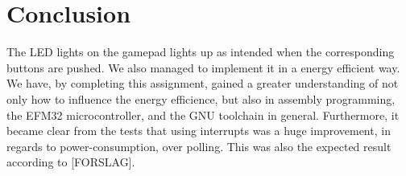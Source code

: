 \section{Conclusion}

The LED lights on the gamepad lights up as intended when the corresponding buttons are pushed. We also managed to implement it in a energy efficient way. We have, by completing this assignment, gained a greater understanding of not only how to influence the energy efficience, but also in assembly programming, the EFM32 microcontroller, and the GNU toolchain in general. Furthermore, it became clear from the tests that using interrupts was a huge improvement, in regards to power-consumption, over polling. This was also the expected result according to [FORSLAG].

